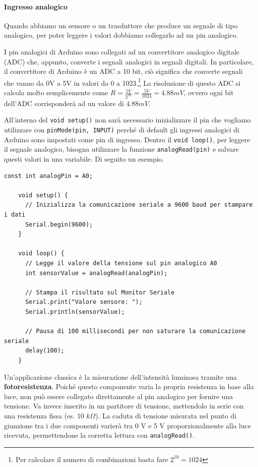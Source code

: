 \documentclass[12pt, letterpaper]{book}
\begin{document}
    \paragraph{Ingresso analogico}

    Quando abbiamo un sensore o un trasduttore che produce un segnale di tipo analogico, per poter leggere i valori dobbiamo collegarlo ad un pin analogico. 

    I pin analogici di Arduino sono collegati ad un convertitore analogico digitale (ADC) che, appunto, converte i segnali analogici in segnali digitali. In particolare, il convertitore di Arduino è un ADC a 10 bit, ciò significa che converte segnali che vanno da 0V a 5V in valori da 0 a 1023.\footnote{Per calcolare il numero di combinazioni basta fare $2^{10} = 1024$} La risoluzione di questo ADC si calcola molto semplicemente come $R = \frac{5 V}{2^{10}} = \frac{5 V}{1024} = 4.88mV$, ovvero ogni bit dell'ADC corrisponderà ad un valore di $4.88mV$.

    All'interno del \lstinline[style=myArduino]{void setup()} non sarà necessario inizializzare il pin che vogliamo utilizzare con \lstinline[style=myArduino]{pinMode(pin, INPUT)} perché di default gli ingressi analogici di Arduino sono impostati come pin di ingresso. Dentro il \lstinline[style=myArduino]{void loop()}, per leggere il segnale analogico, bisogna utilizzare la funzione \lstinline[style=myArduino]{analogRead(pin)} e salvare questi valori in una variabile. Di seguito un esempio.

    \begin{lstlisting}[style=myArduino, basicstyle=\ttfamily\footnotesize, caption={Esempio comunicazione seriale}, captionpos=b, label=code:comunicazione_seriale]
    const int analogPin = A0; 

    void setup() {
      // Inizializza la comunicazione seriale a 9600 baud per stampare i dati
      Serial.begin(9600);
    }

    void loop() {
      // Legge il valore della tensione sul pin analogico A0
      int sensorValue = analogRead(analogPin);

      // Stampa il risultato sul Monitor Seriale
      Serial.print("Valore sensore: ");
      Serial.println(sensorValue);

      // Pausa di 100 millisecondi per non saturare la comunicazione seriale
      delay(100);
    }
    \end{lstlisting}

    Un'applicazione classica è la misurazione dell'intensità luminosa tramite una \textbf{fotoresistenza}. Poiché questo componente varia la propria resistenza in base alla luce, non può essere collegato direttamente al pin analogico per fornire una tensione. Va invece inserito in un partitore di tensione, mettendolo in serie con una resistenza fissa (es. 10 $k\Omega$). La caduta di tensione misurata nel punto di giunzione tra i due componenti varierà tra 0 V e 5 V proporzionalmente alla luce ricevuta, permettendone la corretta lettura con \lstinline[style=myArduino]{analogRead()}.
\end{document}
